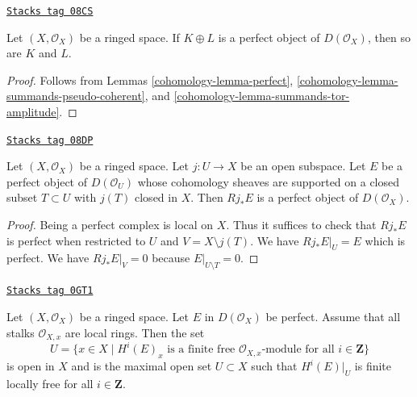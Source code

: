 \begin{lemma}
\label{cohomology-lemma-summands-perfect}
\href{https://stacks.math.columbia.edu/tag/08CS}{\texttt{Stacks tag 08CS}}

Let $(X, \mathcal{O}_X)$ be a ringed space.
If $K \oplus L$ is a perfect object of $D(\mathcal{O}_X)$, then
so are $K$ and $L$.
\end{lemma}

\begin{proof}

Follows from
Lemmas \ref{cohomology-lemma-perfect}, \ref{cohomology-lemma-summands-pseudo-coherent}, and
\ref{cohomology-lemma-summands-tor-amplitude}.
\end{proof}

\begin{lemma}
\label{cohomology-lemma-pushforward-perfect}
\href{https://stacks.math.columbia.edu/tag/08DP}{\texttt{Stacks tag 08DP}}

Let $(X, \mathcal{O}_X)$ be a ringed space. Let $j : U \to X$ be an
open subspace. Let $E$ be a perfect object of $D(\mathcal{O}_U)$
whose cohomology
sheaves are supported on a closed subset $T \subset U$ with $j(T)$
closed in $X$. Then $Rj_*E$ is a perfect object of $D(\mathcal{O}_X)$.
\end{lemma}

\begin{proof}
Being a perfect complex is local on $X$. Thus it suffices to check that
$Rj_*E$ is perfect when restricted to $U$ and $V = X \setminus j(T)$.
We have $Rj_*E|_U = E$ which is perfect. We have
 $Rj_*E|_V = 0$ because $E|_{U \setminus T} = 0$.
\end{proof}

\begin{lemma}
\label{cohomology-lemma-perfect-max-open-coh-loc-free}
\href{https://stacks.math.columbia.edu/tag/0GT1}{\texttt{Stacks tag 0GT1}}

Let $(X, \mathcal{O}_X)$ be a ringed space. Let $E$ in $D(\mathcal{O}_X)$
be perfect. Assume that all stalks $\mathcal{O}_{X, x}$ are local rings.
Then the set
$$
U =
\{x \in X \mid
H^i(E)_x\text{ is a finite free }
\mathcal{O}_{X, x}\text{-module for all }i\in \mathbf{Z}\}
$$
is open in $X$ and is the maximal open set $U \subset X$ such that
$H^i(E)|_U$ is finite locally free for all $i \in \mathbf{Z}$.
\end{lemma}

